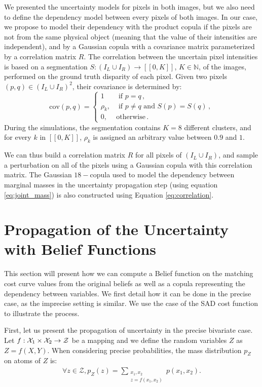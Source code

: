 We presented the uncertainty models for pixels in both images, but we also need to define the dependency model between every pixels of both images. In our case, we propose to model their dependency with the product copula if the pixels are not from the same physical object (meaning that the value of their intensities are independent), and by a Gaussian copula with a covariance matrix parameterized by a correlation matrix $R$. The correlation between the uncertain pixel intensities is based on a segmentation $S:(I_L\cup I_R)\rightarrow[\![0,K]\!]$, $K\in\mathbb{N}$, of the images, performed on the ground truth disparity of each pixel. Given two pixels $(p, q)\in(I_L\cup I_R)^2$, their covariance is determined by:
\begin{equation}
    \mathrm{cov}(p, q) =
    \begin{cases}
        1 &\text{ if }p=q\,,\\
        \rho_k, &\text{ if } p\ne q\text{ and }S(p)=S(q)\,, \\
        0, & \text{otherwise}\,.
    \end{cases}\label{eq:correlation}
\end{equation}
During the simulations, the segmentation contains $K=8$ different clusters, and for every $k$ in $[\![0,K]\!]$, $\rho_k$ is assigned an arbitrary value between $0.9$ and $1$.

We can thus build a correlation matrix $R$ for all pixels of $(I_L\cup I_R)$, and sample a perturbation on all of the pixels using a Gaussian copula with this correlation matrix. The Gaussian $18-$copula used to model the dependency between marginal masses in the uncertainty propagation step (using equation \eqref{eq:joint_mass}) is also constructed using Equation \eqref{eq:correlation}. 

\section{Propagation of the Uncertainty with Belief Functions}
This section will present how we can compute a Belief function on the matching cost curve values from the original beliefs as well as a copula representing the dependency between variables. We first detail how it can be done in the precise case, as the imprecise setting is similar. We use the case of the SAD cost function to illustrate the process.

First, let us present the propagation of uncertainty in the precise bivariate case. Let $f:{\mathcal{X}}_1\times{\mathcal{X}}_2\rightarrow\mathcal{Z}$ be a mapping and we define the random variables $Z$ as $Z=f(X,Y)$. 
When considering precise probabilities, the mass distribution $p_Z$ on atoms of $Z$ is:
\begin{align}
    \forall z\in\mathcal{Z}, p_Z(z)=\sum_{\substack{x_1,x_2\\z=f(x_1,x_2)}}p(x_1,x_2).
\end{align}

